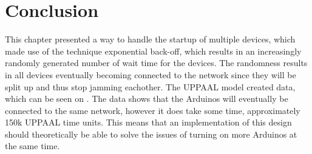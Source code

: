 
\section{Conclusion}

This chapter presented a way to handle the startup of multiple devices, which made use of the technique exponential back-off, which results in an increasingly randomly generated number of wait time for the devices. 
The randomness results in all devices eventually becoming connected to the network since they will be split up and thus stop jamming eachother.
The UPPAAL model created data, which can be seen on .
The data shows that the Arduinos will eventually be connected to the same network, however it does take some time, approximately 150k UPPAAL time units.
This means that an implementation of this design should theoretically be able to solve the issues of turning on more Arduinos at the same time.

